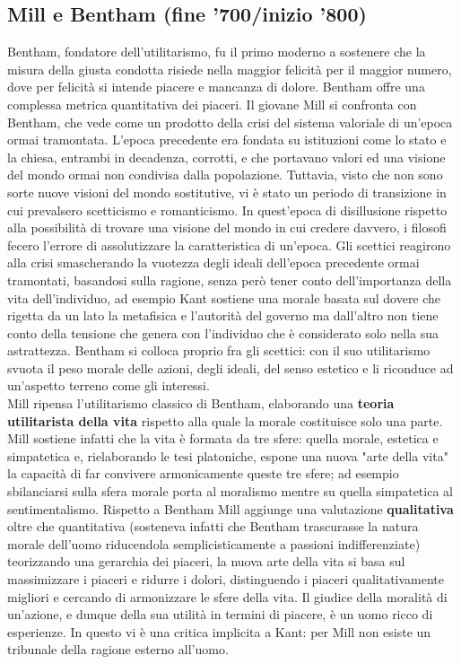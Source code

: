 \documentclass[10pt,a4paper]{article}
\begin{document}
\subsection{Mill e Bentham (fine '700/inizio '800)}
Bentham, fondatore dell'utilitarismo, fu il primo moderno a sostenere che la misura della giusta condotta risiede nella maggior felicità per il maggior numero, dove per felicità si intende piacere e mancanza di dolore. Bentham offre una complessa metrica quantitativa dei piaceri. Il giovane Mill si confronta con Bentham, che vede come un prodotto della crisi del sistema valoriale di un'epoca ormai tramontata. L'epoca precedente era fondata su istituzioni come lo stato e la chiesa, entrambi in decadenza, corrotti, e che portavano valori ed una visione del mondo ormai non condivisa dalla popolazione. Tuttavia, visto che non sono sorte nuove visioni del mondo sostitutive, vi è stato un periodo di transizione in cui prevalsero scetticismo e romanticismo. In quest'epoca di disillusione rispetto alla possibilità di trovare una visione del mondo in cui credere davvero, i filosofi fecero l'errore di assolutizzare la caratteristica di un'epoca. Gli scettici reagirono alla crisi smascherando la vuotezza degli ideali dell'epoca precedente ormai tramontati, basandosi sulla ragione, senza però tener conto dell'importanza della vita dell'individuo, ad esempio Kant sostiene una morale basata sul dovere che rigetta da un lato la metafisica e l'autorità del governo ma dall'altro non tiene conto della tensione che genera con l'individuo che è considerato solo nella sua astrattezza. Bentham si colloca proprio fra gli scettici: con il suo utilitarismo svuota il peso morale delle azioni, degli ideali, del senso estetico e li riconduce ad un'aspetto terreno come gli interessi.\\
Mill ripensa l'utilitarismo classico di Bentham, elaborando una \textbf{teoria utilitarista della vita} rispetto alla quale la morale costituisce solo una parte. Mill sostiene infatti che la vita è formata da tre sfere: quella morale, estetica e simpatetica e, rielaborando le tesi platoniche, espone una nuova "arte della vita" la capacità di far convivere armonicamente queste tre sfere; ad esempio sbilanciarsi sulla sfera morale porta al moralismo mentre su quella simpatetica al sentimentalismo. Rispetto a Bentham Mill aggiunge una valutazione \textbf{qualitativa} oltre che quantitativa (sosteneva infatti che Bentham trascurasse la natura morale dell'uomo riducendola semplicisticamente a passioni indifferenziate) teorizzando una gerarchia dei piaceri, la nuova arte della vita si basa sul massimizzare i piaceri e ridurre i dolori, distinguendo i piaceri qualitativamente migliori e cercando di armonizzare le sfere della vita. Il giudice della moralità di un'azione, e dunque della sua utilità in termini di piacere, è un uomo ricco di esperienze. In questo vi è una critica implicita a Kant: per Mill non esiste un tribunale della ragione esterno all'uomo.\\
\end{document}
